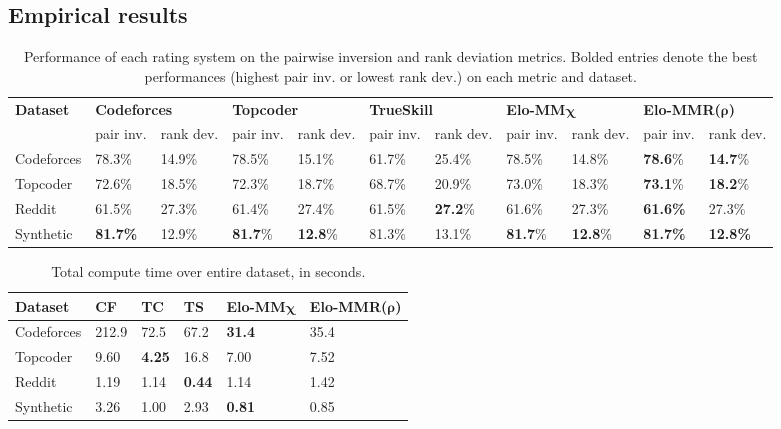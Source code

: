 \subsection{Empirical results}
\begin{table*}
\begin{tabular}{l|ll|ll|ll|ll|ll}
 \hline
\multirow{2}{*}{\textbf{Dataset}} &
  \multicolumn{2}{l|}{\textbf{Codeforces}} &
  \multicolumn{2}{l|}{\textbf{Topcoder}} &
  \multicolumn{2}{l|}{\textbf{TrueSkill}} &
  \multicolumn{2}{l|}{\textbf{Elo-MM$\boldsymbol\chi$}} & 
  \multicolumn{2}{l}{\textbf{Elo-MMR($\boldsymbol\rho$)}} \\ \cline{2-11}
&
  pair inv. &
  rank dev. &
  pair inv. &
  rank dev. &
  pair inv. &
  rank dev. &
  pair inv. &
  rank dev. &
  pair inv. &
  rank dev. \\ \hline
Codeforces & 78.3\% & 14.9\% & 78.5\% & 15.1\% & 61.7\% & 25.4\% & 78.5\% & 14.8\% & {\bf 78.6}\% & {\bf 14.7}\% \\ %
Topcoder  & 72.6\%     & 18.5\%     & 72.3\% & 18.7\%  & 68.7\% & 20.9\% & 73.0\% & 18.3\% & {\bf 73.1}\% & {\bf 18.2}\% \\ %
Reddit     & 61.5\%     & 27.3\%     & 61.4\% & 27.4\% & 61.5\% & {\bf 27.2}\% & 61.6\% & 27.3\% & {\bf 61.6\%} & 27.3\% \\ %
Synthetic  & {\bf 81.7\%}     & 12.9\%     & {\bf 81.7}\% & {\bf 12.8}\% & 81.3\% & 13.1\% & {\bf 81.7}\% & {\bf 12.8}\% & {\bf 81.7\%} & {\bf 12.8\%} \\ \hline
\end{tabular}
\caption{Performance of each rating system on the pairwise inversion and rank deviation metrics. Bolded entries denote the best performances (highest pair inv. or lowest rank dev.) on each metric and dataset.}
\label{tbl:metric-results}
\vspace{-1.2em}
\end{table*}

\begin{table}
\begin{tabular}{l|lllll}
\hline
\textbf{Dataset} & \textbf{CF} & \textbf{TC} & \textbf{TS} & \textbf{Elo-MM$\boldsymbol\chi$} & \textbf{Elo-MMR($\boldsymbol\rho$)} \\ \hline
Codeforces & 212.9 & 72.5 & 67.2 & {\bf 31.4} & 35.4\\
Topcoder   & 9.60 & {\bf 4.25} & 16.8 & 7.00 & 7.52\\
Reddit     & 1.19  & 1.14 & {\bf 0.44} & 1.14 & 1.42 \\
Synthetic  & 3.26  & 1.00 & 2.93 & {\bf 0.81} & 0.85 \\ \hline
\end{tabular}
\caption{Total compute time over entire dataset, in seconds.}
\label{tbl:time-results}
\vspace{-1.2em}
\end{table}

